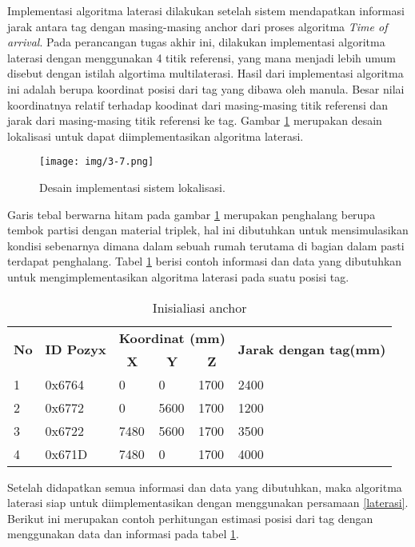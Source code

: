 Implementasi algoritma laterasi dilakukan setelah sistem mendapatkan informasi jarak antara tag dengan masing-masing anchor dari proses algoritma \textit{Time of arrival}. Pada perancangan tugas akhir ini, dilakukan implementasi algoritma laterasi dengan menggunakan 4 titik referensi, yang mana menjadi lebih umum disebut dengan istilah algortima multilaterasi. Hasil dari implementasi algoritma ini adalah berupa koordinat posisi dari tag yang dibawa oleh manula. Besar nilai koordinatnya relatif terhadap koodinat dari masing-masing titik referensi dan jarak dari masing-masing titik referensi ke tag. Gambar \ref{fig:3_7} merupakan desain lokalisasi untuk dapat diimplementasikan algoritma laterasi.
\begin{figure} [!htb]
	\captionsetup{justification=centering}
	\texttt{[image: img/3-7.png]}
	\caption{Desain implementasi sistem lokalisasi.}
	\label{fig:3_7}
\end{figure}
Garis tebal berwarna hitam pada gambar \ref{fig:3_7} merupakan penghalang berupa tembok partisi dengan material triplek, hal ini dibutuhkan untuk mensimulasikan kondisi sebenarnya dimana dalam sebuah rumah terutama di bagian dalam pasti terdapat penghalang. Tabel \ref{tab:lokalisasi} berisi contoh informasi dan data yang dibutuhkan untuk mengimplementasikan algoritma laterasi pada suatu posisi tag.
\begin{table}[]
	\caption{Inisialiasi anchor}
	\label{tab:lokalisasi}
	\begin{tabular}{|l|l|l|l|l|l|}
		\hline
		\multirow{2}{*}{\textbf{No}} & \multirow{2}{*}{\textbf{ID Pozyx}} & \multicolumn{3}{c|}{\textbf{Koordinat (mm)}} & \multirow{2}{*}{\textbf{Jarak dengan tag(mm)}} \\ \cline{3-5}
		&  & \multicolumn{1}{c|}{\textbf{X}} & \multicolumn{1}{c|}{\textbf{Y}} & \multicolumn{1}{c|}{\textbf{Z}} &  \\ \hline
		1 & 0x6764 & 0 & 0 & 1700 & 2400 \\ \hline
		2 & 0x6772 & 0 & 5600 & 1700 & 1200 \\ \hline
		3 & 0x6722 & 7480 & 5600 & 1700 & 3500 \\ \hline
		4 & 0x671D & 7480 & 0 & 1700 & 4000 \\ \hline
	\end{tabular}
\end{table}
Setelah didapatkan semua informasi dan data yang dibutuhkan, maka algoritma laterasi siap untuk diimplementasikan dengan menggunakan persamaan \ref{laterasi}.  Berikut ini merupakan contoh perhitungan estimasi posisi dari tag dengan menggunakan data dan informasi pada tabel \ref{tab:lokalisasi}.
 
